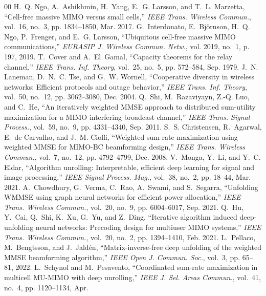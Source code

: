 \documentclass[conference]{IEEEtran}
\begin{document}
\begin{thebibliography}{00}
 H.~Q. Ngo, A.~Ashikhmin, H.~Yang, E.~G. Larsson,
and T.~L. Marzetta, ``Cell-free massive MIMO versus small cells,''
\emph{IEEE Trans. Wireless Commun.}, vol.~16, no.~3, pp. 1834--1850, Mar.
2017.
 G.~Interdonato, E.~Bj\"ornson, H.~Q.
Ngo, P.~Frenger, and E.~G. Larsson, ``Ubiquitous cell-free massive MIMO
communications,'' \emph{EURASIP J. Wireless Commun. Netw.}, vol. 2019,
no.~1, p. 197, 2019.
 T.~Cover and A.~El~Gamal, ``Capacity theorems for
the relay channel,'' \emph{IEEE Trans. Inf. Theory}, vol.~25, no.~5, pp.
572--584, Sep. 1979.
 J.~N. Laneman, D.~N.~C. Tse, and G.~W.
Wornell, ``Cooperative diversity in wireless networks: Efficient protocols
and outage behavior,'' \emph{IEEE Trans. Inf. Theory}, vol.~50, no.~12, pp.
3062--3080, Dec. 2004.
 Q.~Shi, M.~Razaviyayn, Z.-Q. Luo, and C.~He, ``An
iteratively weighted MMSE approach to distributed sum-utility maximization
for a MIMO interfering broadcast channel,'' \emph{IEEE Trans. Signal
Process.}, vol.~59, no.~9, pp. 4331--4340, Sep. 2011.
 S.~S. Christensen, R.~Agarwal, E.~de
Carvalho, and J.~M. Cioffi, ``Weighted sum-rate maximization using weighted
MMSE for MIMO-BC beamforming design,'' \emph{IEEE Trans. Wireless Commun.},
vol.~7, no.~12, pp. 4792--4799, Dec. 2008.
 V.~Monga, Y.~Li, and Y.~C. Eldar, ``Algorithm
unrolling: Interpretable, efficient deep learning for signal and image
processing,'' \emph{IEEE Signal Process. Mag.}, vol.~38, no.~2, pp. 18--44,
Mar. 2021.
 A.~Chowdhury, G.~Verma, C.~Rao, A.~Swami,
and S.~Segarra, ``Unfolding WMMSE using graph neural networks for efficient
power allocation,'' \emph{IEEE Trans. Wireless Commun.}, vol.~20, no.~9,
pp. 6004--6017, Sep. 2021.
 Q.~Hu, Y.~Cai, Q.~Shi, K.~Xu, G.~Yu, and Z.~Ding,
``Iterative algorithm induced deep-unfolding neural networks: Precoding
design for multiuser MIMO systems,'' \emph{IEEE Trans. Wireless Commun.},
vol.~20, no.~2, pp. 1394--1410, Feb. 2021.
 L.~Pellaco, M.~Bengtsson, and J.~Jald\'en,
``Matrix-inverse-free deep unfolding of the weighted MMSE beamforming
algorithm,'' \emph{IEEE Open J. Commun. Soc.}, vol.~3, pp. 65--81, 2022.
 L.~Schynol and M.~Pesavento, ``Coordinated
sum-rate maximization in multicell MU-MIMO with deep unrolling,''
\emph{IEEE J. Sel. Areas Commun.}, vol.~41, no.~4, pp. 1120--1134, Apr.

\end{thebibliography}
\end{document}
